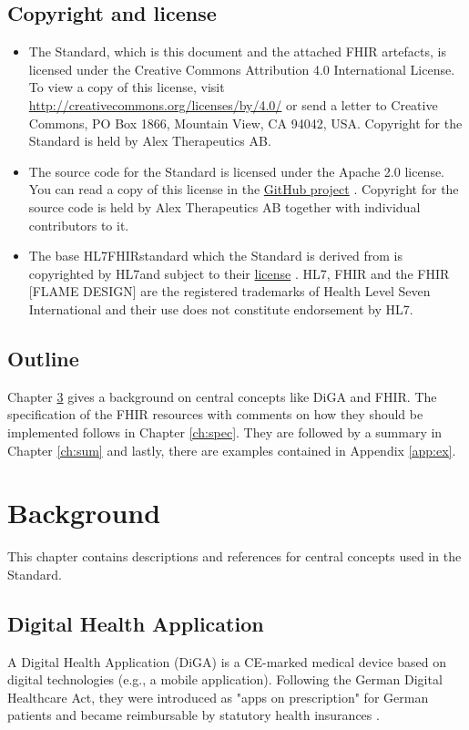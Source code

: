 \documentclass[12px]{report}
\newcommand{\fhir}{FHIR\textsuperscript{\textregistered}}
\newcommand{\hl}{HL7\textsuperscript{\textregistered}}
\begin{document}
\section{Copyright and license}

\begin{itemize}
    \item The Standard, which is this document and the attached FHIR artefacts, is licensed under the Creative Commons Attribution 4.0 International License. 
To view a copy of this license, visit \href{http://creativecommons.org/licenses/by/4.0/}{http://creativecommons.org/licenses/by/4.0/} or send a letter to Creative Commons, PO Box 1866, Mountain View, CA 94042, USA.
Copyright for the Standard is held by Alex Therapeutics AB. 
    \item The source code for the Standard is licensed under the Apache 2.0 license. 
You can read a copy of this license in the \href{https://github.com/alex-therapeutics/diga-nicotine-usage-fhir/blob/main/LICENSE}{GitHub project} \cite{github}.
Copyright for the source code is held by Alex Therapeutics AB together with individual contributors to it.
    \item The base \hl \fhir standard which the Standard is derived from is copyrighted by \hl and subject to their \href{http://hl7.org/fhir/license.html}{license} \cite{fhirlic}.
HL7, FHIR and the FHIR [FLAME DESIGN] are the registered trademarks of Health Level Seven International and their use does not constitute endorsement by HL7.
\end{itemize}

\section{Outline}
Chapter \ref{ch:bg} gives a background on central concepts like DiGA and FHIR. The specification of the FHIR resources with comments on how they should be implemented follows in Chapter \ref{ch:spec}.
They are followed by a summary in Chapter \ref{ch:sum} and lastly, there are examples contained in Appendix \ref{app:ex}.


\chapter{Background}
\label{ch:bg}

This chapter contains descriptions and references for central concepts used in the Standard.

\section{Digital Health Application}
A Digital Health Application (DiGA) is a CE-marked medical device based on digital technologies (e.g., a mobile application). Following the German Digital Healthcare Act, they were introduced as "apps on prescription" for German patients and became reimbursable by statutory health insurances \cite{diga}.
\end{document}
